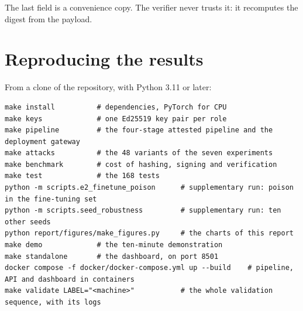 The last field is a convenience copy. The verifier never trusts it: it recomputes the digest from the payload.

\section{Reproducing the results}
\label{app:repro}
\vspace{-0.45\baselineskip}{\color{cgrule}\rule{\textwidth}{0.6pt}}\par\vspace{0.15\baselineskip}
From a clone of the repository, with Python 3.11 or later:

\begin{lstlisting}
make install          # dependencies, PyTorch for CPU
make keys             # one Ed25519 key pair per role
make pipeline         # the four-stage attested pipeline and the deployment gateway
make attacks          # the 48 variants of the seven experiments
make benchmark        # cost of hashing, signing and verification
make test             # the 168 tests
python -m scripts.e2_finetune_poison      # supplementary run: poison in the fine-tuning set
python -m scripts.seed_robustness         # supplementary run: ten other seeds
python report/figures/make_figures.py     # the charts of this report
make demo             # the ten-minute demonstration
make standalone       # the dashboard, on port 8501
docker compose -f docker/docker-compose.yml up --build    # pipeline, API and dashboard in containers
make validate LABEL="<machine>"           # the whole validation sequence, with its logs
\end{lstlisting}

